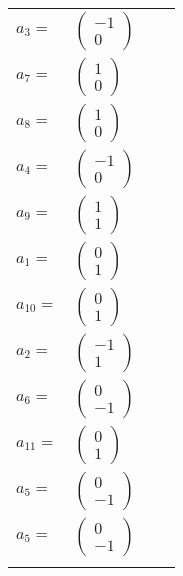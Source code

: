 \documentclass[1p]{elsarticle_modified}
\theoremstyle{definition}
\begin{document}
\begin{tabular}{m{7pt} m{180pt} m{7pt} m{180pt} }
\flushright $a_{3}=$&$\begin{pmatrix}-1\\0\end{pmatrix}$ \\
\flushright $a_{7}=$&$\begin{pmatrix}1\\0\end{pmatrix}$ \\
\flushright $a_{8}=$&$\begin{pmatrix}1\\0\end{pmatrix}$ \\
\flushright $a_{4}=$&$\begin{pmatrix}-1\\0\end{pmatrix}$ \\
\flushright $a_{9}=$&$\begin{pmatrix}1\\1\end{pmatrix}$ \\
\flushright $a_{1}=$&$\begin{pmatrix}0\\1\end{pmatrix}$ \\
\flushright $a_{10}=$&$\begin{pmatrix}0\\1\end{pmatrix}$ \\
\flushright $a_{2}=$&$\begin{pmatrix}-1\\1\end{pmatrix}$ \\
\flushright $a_{6}=$&$\begin{pmatrix}0\\-1\end{pmatrix}$ \\
\flushright $a_{11}=$&$\begin{pmatrix}0\\1\end{pmatrix}$ \\
\flushright $a_{5}=$&$\begin{pmatrix}0\\-1\end{pmatrix}$\\ \flushright $a_{5}=$&$\begin{pmatrix}0\\-1\end{pmatrix}$\\&\end{tabular}
\end{document}
